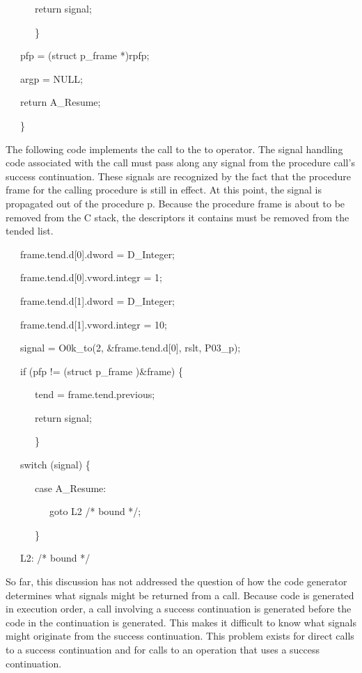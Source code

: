 {\ttfamily\mdseries
\ \ \ \ \ \ return signal;}

{\ttfamily\mdseries
\ \ \ \ \ \ \}}

{\ttfamily\mdseries
\ \ \ pfp = (struct p\_frame *)rpfp;}

{\ttfamily\mdseries
\ \ \ argp = NULL;}

{\ttfamily\mdseries
\ \ \ return A\_Resume;}

{\ttfamily\mdseries
\ \ \ \}}


The following code implements the call to the to operator. The signal
handling code associated with the call must pass along any signal from
the procedure call's success continuation. These signals are
recognized by the fact that the procedure frame for the calling
procedure is still in effect. At this point, the signal is propagated
out of the procedure p. Because the procedure frame is about to be
removed from the C stack, the descriptors it contains must be removed
from the tended list.

{\ttfamily\mdseries
\ \ \ frame.tend.d[0].dword = D\_Integer;}

{\ttfamily\mdseries
\ \ \ frame.tend.d[0].vword.integr = 1;}

{\ttfamily\mdseries
\ \ \ frame.tend.d[1].dword = D\_Integer;}

{\ttfamily\mdseries
\ \ \ frame.tend.d[1].vword.integr = 10;}

{\ttfamily\mdseries
\ \ \ signal = O0k\_to(2, \&frame.tend.d[0], rslt, P03\_p);}

{\ttfamily\mdseries
\ \ \ if (pfp != (struct p\_frame )\&frame) \{}

{\ttfamily\mdseries
\ \ \ \ \ \ tend = frame.tend.previous;}

{\ttfamily\mdseries
\ \ \ \ \ \ return signal;}

{\ttfamily\mdseries
\ \ \ \ \ \ \}}

{\ttfamily\mdseries
\ \ \ switch (signal) \{}

{\ttfamily\mdseries
\ \ \ \ \ \ case A\_Resume:}

{\ttfamily\mdseries
\ \ \ \ \ \ \ \ \ goto L2 /* bound */;}

{\ttfamily\mdseries
\ \ \ \ \ \ \}}

{\ttfamily\mdseries
\ \ \ L2: /* bound */}


So far, this discussion has not addressed the question of how the code
generator determines what signals might be returned from a
call. Because code is generated in execution order, a call involving a
success continuation is generated before the code in the continuation
is generated. This makes it difficult to know what signals might
originate from the success continuation. This problem exists for
direct calls to a success continuation and for calls to an operation
that uses a success continuation.

